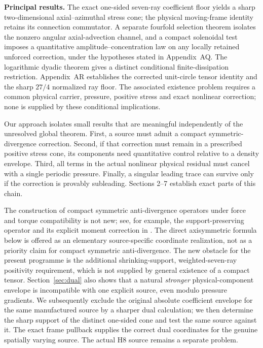 \documentclass[11pt,a4paper]{article}
\theoremstyle{plain}
\theoremstyle{definition}
\begin{document}
\noindent\textbf{Principal results.}
The exact one-sided seven-ray coefficient floor yields a sharp
two-dimensional axial--azimuthal stress cone; the physical
moving-frame identity retains its connection commutator.
A separate fourfold selection theorem isolates the nonzero angular
axial-advection channel, and a compact solenoidal test imposes a
quantitative amplitude--concentration law on any locally retained
unforced correction, under the hypotheses stated in Appendix~AQ.
The logarithmic dyadic theorem gives a distinct conditional
finite-dissipation restriction. Appendix~AR establishes the corrected
unit-circle tensor identity and the sharp \(27/4\) normalized ray floor.
The associated existence problem requires a common physical
carrier, pressure, positive stress and exact nonlinear correction;
none is supplied by these conditional implications.


Our approach isolates small results that are meaningful independently of
the unresolved global theorem. First, a source must admit a compact
symmetric-divergence correction. Second, if that correction must remain
in a prescribed positive stress cone, its components need quantitative
control relative to a density envelope. Third, all terms in the actual
nonlinear physical residual must cancel with a single periodic pressure.
Finally, a singular leading trace can survive only if the correction is
provably subleading. Sections 2--7 establish exact parts of this chain.

The construction of compact symmetric anti-divergence operators under
force and torque compatibility is not new; see, for example, the
support-preserving operator and its explicit moment correction in
\cite[\S3.6 and Appendix A]{Zhao2026}. The direct axisymmetric formula
below is offered as an elementary source-specific coordinate realization,
not as a priority claim for compact symmetric anti-divergence. The new
obstacle for the present programme is the additional shrinking-support,
weighted-seven-ray positivity requirement, which is not supplied by
general existence of a compact tensor. Section~\ref{sec:dual} also
shows that a natural \emph{stronger} physical-component envelope is
incompatible with one explicit source, even modulo pressure gradients.
We subsequently exclude the original absolute coefficient envelope
for the same manufactured source by a sharper dual calculation;
we then determine the sharp support of the distinct one-sided cone
and test the same source against it. The exact frame pullback supplies
the correct dual coordinates for the genuine spatially varying source.
The actual H8 source remains a separate problem.
\end{document}
